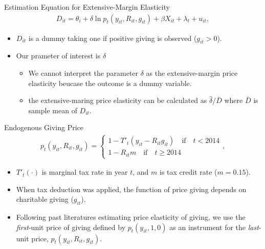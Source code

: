 \documentclass[
  ignorenonframetext,
  aspectratio=169,
]{beamer}
\providecommand{\tightlist}{%
  \setlength{\itemsep}{0pt}\setlength{\parskip}{0pt}}
\begin{document}
\begin{frame}{Estimation Equation for Extensive-Margin Elasticity}
\protect\hypertarget{estimation-equation-for-extensive-margin-elasticity}{}
\begin{align}
  D_{it} = \theta_i + \delta \ln p_t(y_{it}, R_{it}, g_{it})
  + \beta X_{it} + \lambda_t + u_{it}, \label{eq:extensive}
\end{align}

\begin{itemize}
\tightlist
\item
  \(D_{it}\) is a dummy taking one if positive giving is observed (\(g_{it} > 0\)).
\item
  Our prameter of interest is \(\delta\)

  \begin{itemize}
  \tightlist
  \item
    We cannot interpret the parameter \(\delta\) as the extensive-margin price elasticity beucase the outcome is a dummy variable.
  \item
    the extensive-maring price elasticity can be calculated as \(\hat{\delta} / \bar{D}\) where \(\bar{D}\) is sample mean of \(D_{it}\).
  \end{itemize}
\end{itemize}
\end{frame}

\begin{frame}{Endogenous Giving Price}
\protect\hypertarget{endogenous-giving-price}{}
\begin{align}
  p_t(y_{it}, R_{it}, g_{it}) =
  \begin{cases}
    1 - T'_t(y_{it} - R_{it} g_{it})  \quad\text{if}\quad t < 2014  \\
    1 - R_{it} m \quad\text{if}\quad t \ge 2014
  \end{cases},
\end{align}

\begin{itemize}
\tightlist
\item
  \(T'_t(\cdot)\) is marginal tax rate in year \(t\), and \(m\) is tax credit rate (\(m = 0.15\)).
\item
  When tax deduction was applied, the function of price giving depends on charitable giving (\(g_{it}\)).
\item
  Following past literatures estimating price elasticity of giving, we use the \emph{first}-unit price of giving defined by \(p_t(y_{it}, 1, 0)\) as an instrument for the \emph{last}-unit price, \(p_t(y_{it}, R_{it}, g_{it})\).
\end{itemize}
\end{frame}
\end{document}
